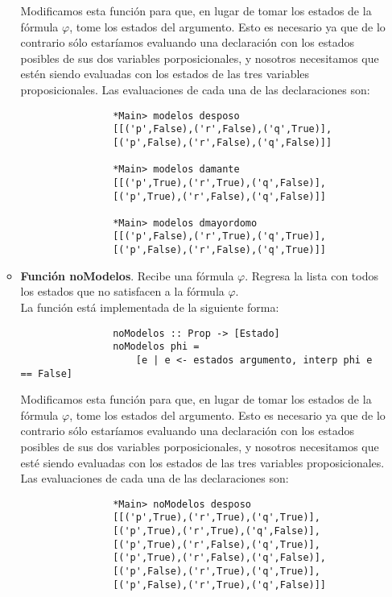 \documentclass[letterpaper,11pt]{article}
\begin{document}
\begin{itemize}
\begin{itemize}
            Modificamos esta función para que, en lugar de tomar los estados de 
            la fórmula $\varphi$, tome los estados del argumento. Esto es 
            necesario ya que de lo contrario sólo estaríamos evaluando una 
            declaración con los estados posibles de sus dos variables 
            porposicionales, y nosotros necesitamos que estén siendo evaluadas
            con los estados de las tres variables proposicionales.
            Las evaluaciones de cada una de las declaraciones son:
            \begin{lstlisting}
                *Main> modelos desposo
                [[('p',False),('r',False),('q',True)],
                [('p',False),('r',False),('q',False)]]
                
                *Main> modelos damante
                [[('p',True),('r',True),('q',False)],
                [('p',True),('r',False),('q',False)]]
                
                *Main> modelos dmayordomo
                [[('p',False),('r',True),('q',True)],
                [('p',False),('r',False),('q',True)]]
            \end{lstlisting}

            \item \textbf{Función noModelos}. Recibe una fórmula $\varphi$.
            Regresa la lista con todos los estados que no satisfacen a la 
            fórmula $\varphi$. \\
            La función está implementada de la siguiente forma:
            \begin{lstlisting}
                noModelos :: Prop -> [Estado]
                noModelos phi = 
                    [e | e <- estados argumento, interp phi e == False]
            \end{lstlisting}

            Modificamos esta función para que, en lugar de tomar los estados de
            la fórmula $\varphi$, tome los estados del argumento.  Esto es 
            necesario ya que de lo contrario sólo estaríamos evaluando una 
            declaración con los estados posibles de sus dos variables 
            porposicionales, y nosotros necesitamos que esté siendo 
            evaluadas con los estados de las tres variables proposicionales.
            Las evaluaciones de cada una de las declaraciones son: 
            \begin{lstlisting}
                *Main> noModelos desposo
                [[('p',True),('r',True),('q',True)],
                [('p',True),('r',True),('q',False)],
                [('p',True),('r',False),('q',True)],
                [('p',True),('r',False),('q',False)],
                [('p',False),('r',True),('q',True)],
                [('p',False),('r',True),('q',False)]]
                

\end{lstlisting}
\end{itemize}
\end{itemize}
\end{document}
